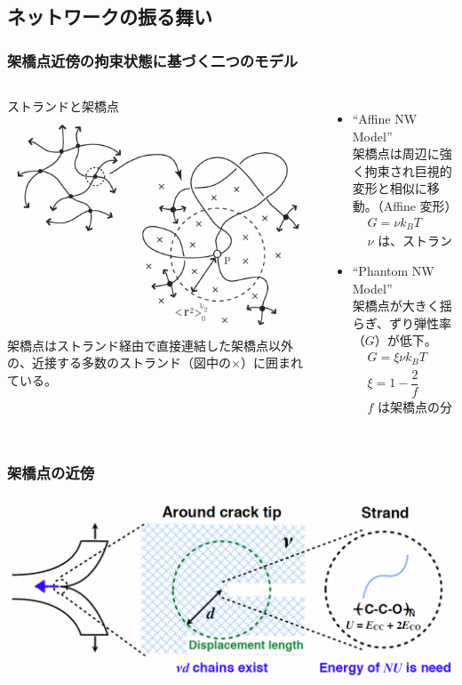 \documentclass[12pt, dvipdfmx]{beamer}
\newcommand{\backupend}{
   \addtocounter{framenumberappendix}{-\value{framenumber}}
   \addtocounter{framenumber}{\value{framenumberappendix}} 
}
\begin{document}
\subsection{ネットワークの振る舞い}
\begin{frame}
	\frametitle{架橋点近傍の拘束状態に基づく二つのモデル}
		\begin{columns}[totalwidth=1\textwidth]
				\begin{block}{ストランドと架橋点}
					\includegraphics[width=\textwidth]{JP_vicinity.png}
					架橋点はストランド経由で直接連結した架橋点以外の、近接する多数のストランド（図中の×）に囲まれている。
				\end{block}
			\begin{itemize}
				\item ``Affine NW Model''\\
					架橋点は周辺に強く拘束され巨視的変形と相似に移動。（Affine 変形）
					\footnotesize
					\begin{align*}
						&G=\nu k_B T \\
						&\text{$\nu$ は、ストランドの数密度}
					\end{align*}
					\normalsize
				\item ``Phantom NW Model''\\
					架橋点が大きく揺らぎ、ずり弾性率（$G$）が低下。
					\footnotesize
					\begin{align*}
						&G=\xi \nu k_B T \\
						&\xi= 1 -\dfrac{2}{f}\\
						&\text{$f$ は架橋点の分岐数}
					\end{align*}
			\end{itemize}
		\end{columns}
\end{frame}

\begin{frame}
	\frametitle{架橋点の近傍}
		\includegraphics[width=\textwidth]{Lake_Thomas.png}
\end{frame}

\end{document}
